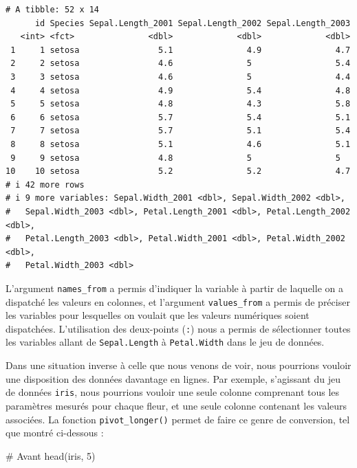 \documentclass[
  letterpaper,
]{book}
\newenvironment{Shaded}{\begin{snugshade}}{\end{snugshade}}
\newcommand{\CommentTok}[1]{\textcolor[rgb]{0.37,0.37,0.37}{#1}}
\newcommand{\DecValTok}[1]{\textcolor[rgb]{0.68,0.00,0.00}{#1}}
\newcommand{\FunctionTok}[1]{\textcolor[rgb]{0.28,0.35,0.67}{#1}}
\newcommand{\NormalTok}[1]{\textcolor[rgb]{0.00,0.23,0.31}{#1}}
\begin{document}
\begin{verbatim}
# A tibble: 52 x 14
      id Species Sepal.Length_2001 Sepal.Length_2002 Sepal.Length_2003
   <int> <fct>               <dbl>             <dbl>             <dbl>
 1     1 setosa                5.1               4.9               4.7
 2     2 setosa                4.6               5                 5.4
 3     3 setosa                4.6               5                 4.4
 4     4 setosa                4.9               5.4               4.8
 5     5 setosa                4.8               4.3               5.8
 6     6 setosa                5.7               5.4               5.1
 7     7 setosa                5.7               5.1               5.4
 8     8 setosa                5.1               4.6               5.1
 9     9 setosa                4.8               5                 5  
10    10 setosa                5.2               5.2               4.7
# i 42 more rows
# i 9 more variables: Sepal.Width_2001 <dbl>, Sepal.Width_2002 <dbl>,
#   Sepal.Width_2003 <dbl>, Petal.Length_2001 <dbl>, Petal.Length_2002 <dbl>,
#   Petal.Length_2003 <dbl>, Petal.Width_2001 <dbl>, Petal.Width_2002 <dbl>,
#   Petal.Width_2003 <dbl>
\end{verbatim}

L'argument \texttt{names\_from} a permis d'indiquer la variable à partir
de laquelle on a dispatché les valeurs en colonnes, et l'argument
\texttt{values\_from} a permis de préciser les variables pour lesquelles
on voulait que les valeurs numériques soient dispatchées. L'utilisation
des deux-points (\texttt{:}) nous a permis de sélectionner toutes les
variables allant de \texttt{Sepal.Length} à \texttt{Petal.Width} dans le
jeu de données.

Dans une situation inverse à celle que nous venons de voir, nous
pourrions vouloir une disposition des données davantage en lignes. Par
exemple, s'agissant du jeu de données \texttt{iris}, nous pourrions
vouloir une seule colonne comprenant tous les paramètres mesurés pour
chaque fleur, et une seule colonne contenant les valeurs associées. La
fonction \texttt{pivot\_longer()} permet de faire ce genre de
conversion, tel que montré ci-dessous :

\begin{Shaded}
\begin{Highlighting}[]
\CommentTok{\# Avant}
\FunctionTok{head}\NormalTok{(iris, }\DecValTok{5}\NormalTok{)}
\end{Highlighting}
\end{Shaded}
\end{document}

